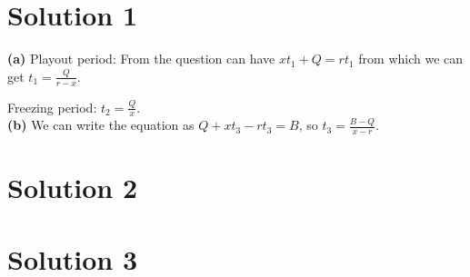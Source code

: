 \documentclass{article}
\begin{document}
\section{Solution 1}
\textbf{(a)} Playout period: From the question can have $xt_{1}+Q=rt_{1}$ from which we can get $t_{1}=\frac{Q}{r-x}$.

Freezing period: $t_{2}=\frac{Q}{x}$.\\
\textbf{(b)} We can write the equation as $Q+xt_{3}-rt_{3}=B$, so $t_{3}=\frac{B-Q}{x-r}$.
\section{Solution 2}

\section{Solution 3}
\end{document}
